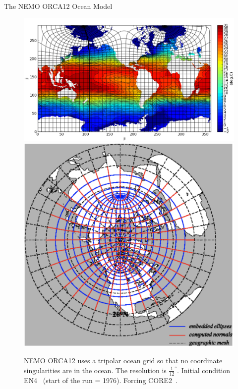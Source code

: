\begin{frame}{The NEMO ORCA12 Ocean Model~\cite{madec2015nemo}}
\vspace{-20pt}
\begin{figure}[htb!]
    \centering
    \hspace{-30pt}\includegraphics[width=0.74\linewidth]{images/example-images/fig-irregular.png}
     \includegraphics[width=0.30\linewidth]{images/example-images/nemo-poles.png}
    \vspace{-7pt}
    \caption{NEMO ORCA12 uses a tripolar ocean grid so that no coordinate singularities are in the ocean.
     The resolution is $\frac{1}{12}^{\circ}$.
      Initial condition EN4~\cite{good2013en4, HadObs} (start of the run = 1976).
Forcing CORE2~\cite{griffies2012datasets,large2009global}.}
    \label{fig:}
\end{figure}
\end{frame}


